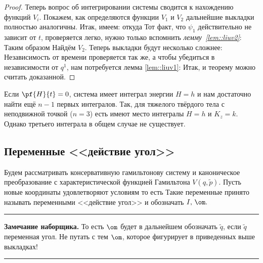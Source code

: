\documentclass[a4paper,12pt]{article}
\newcommand{\tstm}[1]{\emph{#1}}
\newenvironment{nbb}{\par\vskip3pt\hrule\vskip3pt\textbf{\footnotesize Замечание наборщика.}\footnotesize }
{\vskip3pt\hrule\par\vskip3pt}
\newcommand{\ti}[1]{\widetilde{{#1}}}
\begin{document}
\begin{proof}
Теперь вопрос об интегрировании системы сводится к нахождению функций $V_i$.
Покажем, как определяются функции $V_1$ и $V_2$ дальнейшие выкладки полностью аналогичны.
Итак, имеем:
откуда
Тот факт, что $\psi_1$ действительно не зависит от $t$, проверяется легко, нужно
только вспомнить \tstm{лемму~\ref{lem::liuv2}}:
Таким образом
Найдём $V_2$. Теперь выкладки будут несколько сложнее:
Независимость от времени проверяется так же, а чтобы убедиться в независимости от $q^1$, нам потребуется лемма \ref{lem::liuv1}:
Итак,
и теорему можно считать доказанной.
\end{proof}
\begin{note}
Если $\pf{H}{t}=0$, система имеет интеграл энергии $H=h$ и нам достаточно найти ещё $n-1$ первых интегралов.
Так, для тяжелого твёрдого тела с неподвижной точкой ($n=3$) есть имеют место интегралы $H=h$ и $K_z=k$.
Однако третьего интеграла в общем случае не существует.
\end{note}

\subsection{Переменные <<действие угол>>}

Будем рассматривать консервативную гамильтонову систему и каноническое преобразование с характеристической  функцией Гамильтона $V(q,\ti{p}).$
Пусть новые координаты удовлетворяют условиям
\equ{\dot{\ti{q}}=\pf{\ti{H}}{\ti p}=\om(\ti p),\quad \dot{\ti p}=0,}
то есть
\equ{\ti p=\ti p_0,\quad \ti q=\om(\ti p_0)t+\ti q_0.}
Такие переменные принято называть переменными <<действие угол>> и обозначать $I,\,\om.$
\begin{nbb}
То есть $\om$ будет в дальнейшем обозначать $\ti q$, если $\ti q$ переменная угол. Не путать с тем $\om$,
которое фигурирует в приведенных выше выкладках!
\end{nbb}
\end{document}
